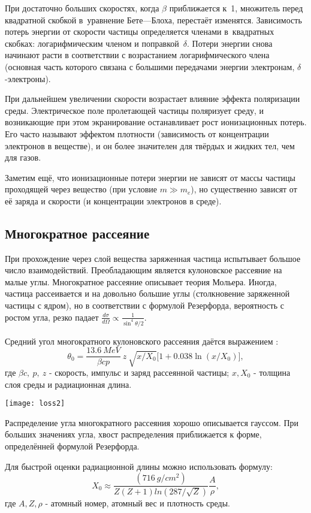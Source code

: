 При достаточно больших скоростях, когда $\beta$ приближается к~1,
множитель перед квадратной скобкой в~уравнение Бете---Блоха, перестаёт
изменятся. Зависимость потерь энергии от скорости частицы определяется
членами в~квадратных скобках: логарифмическим членом и
поправкой~$\delta$. Потери энергии снова начинают расти в соответствии
с возрастанием логарифмического члена (основная часть которого связана
с большими передачами энергии электронам, $\delta$-электроны).

При дальнейшем увеличении скорости возрастает влияние эффекта
поляризации среды. Электрическое поле пролетающей частицы
поляризует среду, и возникающие при этом экранирование останавливает рост
ионизационных потерь. Его часто называют эффектом плотности (зависимость
от концентрации электронов в веществе), и он более значителен для твёрдых
и жидких тел, чем для газов.

Заметим ещё, что ионизационные потери энергии не зависят от массы
частицы проходящей через вещество (при условие $m\gg m_e$), но
существенно зависят от её заряда и скорости (и концентрации электронов
в среде).

\subsection{Многократное рассеяние}
При прохождение через слой вещества заряженная частица испытывает
большое число взаимодействий. Преобладающим является кулоновское
рассеяние на малые углы. Многократное рассеяние описывает теория
Мольера. Иногда, частица рассеивается и на довольно
большие углы (столкновение заряженной частицы с ядром), но в соответствии
с формулой Резерфорда, вероятность с ростом угла, резко падает
$\frac{d\sigma}{d\Omega}\propto \frac{1}{\sin^4\theta /2}$.

Средний угол многократного кулоновского рассеяния даётся выражением
\cite{kor:06}:
\[
\theta_0=\frac{13.6~MeV}{\beta c p}~z~\sqrt{x/X_0}
\Big[1+0.038\ln(x/X_0)\Big],
\]
где $\beta c,~p,~z$ - скорость, импульс и заряд рассеянной частицы;
$x, X_0$ - толщина слоя среды и радиационная длина.
\begin{floatingfigure}[l]{5.7cm}
  \texttt{[image: loss2]}
\end{floatingfigure}
Распределение угла многократного рассеяния хорошо описывается гауссом.
При больших значениях угла, хвост распределения приближается к форме,
определённей формулой Резерфорда.

Для быстрой оценки радиационной длины можно использовать формулу:
\[
X_0\approx \frac{(716~g/cm^2)}{Z(Z+1)ln(287/\sqrt{Z})}\frac{A}{\rho},
\]
где $A, Z, \rho$ - атомный номер, атомный вес и плотность среды.

